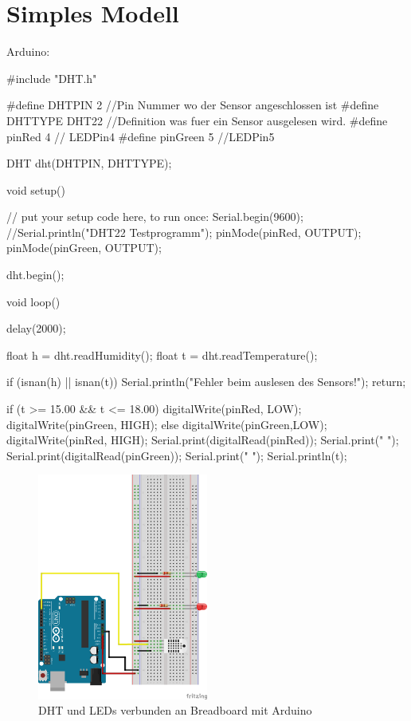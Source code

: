 \documentclass[12pt]{article}
\begin{document}
\section{Simples Modell}
Arduino:
\begin{code}
#include "DHT.h"

#define DHTPIN 2 //Pin Nummer wo der Sensor angeschlossen ist
#define DHTTYPE DHT22 //Definition was fuer ein Sensor ausgelesen wird.
#define pinRed 4 // LEDPin4
#define pinGreen 5 //LEDPin5

DHT dht(DHTPIN, DHTTYPE);

void setup() {
  // put your setup code here, to run once:
  Serial.begin(9600);
  //Serial.println("DHT22 Testprogramm");
  pinMode(pinRed, OUTPUT);
  pinMode(pinGreen, OUTPUT);

  dht.begin();

}

void loop() {
  delay(2000);

  float h = dht.readHumidity();
  float t = dht.readTemperature();

  if (isnan(h) || isnan(t)) {
    Serial.println("Fehler beim auslesen des Sensors!");
    return;
  }

  if (t >= 15.00 && t <= 18.00) {
    digitalWrite(pinRed, LOW);
    digitalWrite(pinGreen, HIGH);
  }
  else  {
    digitalWrite(pinGreen,LOW);
    digitalWrite(pinRed, HIGH);    
  }   
   Serial.print(digitalRead(pinRed));
   Serial.print(" ");
   Serial.print(digitalRead(pinGreen));
   Serial.print(" ");
   Serial.println(t);
}
\end{code}
\begin{figure}[H]
\begin{center}
\includegraphics[width=0.5\textwidth]{pics/dhtled.png}
\caption{DHT und LEDs verbunden an Breadboard mit Arduino}
\end{center}
\end{figure}
\end{document}
